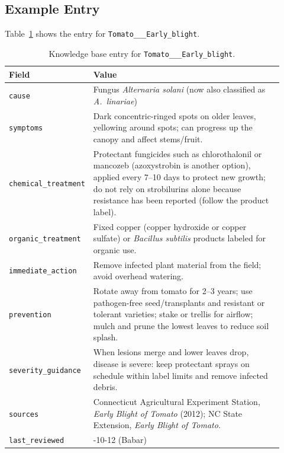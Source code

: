 \subsection{Example Entry}
Table~\ref{tab:kb_example} shows the entry for \texttt{Tomato\_\_\_Early\_blight}.

\begin{table}[htbp]
\centering
\small
\caption{Knowledge base entry for \texttt{Tomato\_\_\_Early\_blight}.}
\label{tab:kb_example}
\begin{tabular}{>{\raggedright\arraybackslash}p{0.22\linewidth}>{\raggedright\arraybackslash}p{0.70\linewidth}}
\toprule
\textbf{Field} & \textbf{Value} \\
\midrule
\texttt{cause} & Fungus \textit{Alternaria solani} (now also classified as \textit{A.\ linariae}) \\
\texttt{symptoms} & Dark concentric-ringed spots on older leaves, yellowing around spots; can progress up the canopy and affect stems/fruit. \\
\texttt{chemical\_treatment} & Protectant fungicides such as chlorothalonil or mancozeb (azoxystrobin is another option), applied every 7--10 days to protect new growth; do not rely on strobilurins alone because resistance has been reported (follow the product label). \\
\texttt{organic\_treatment} & Fixed copper (copper hydroxide or copper sulfate) or \textit{Bacillus subtilis} products labeled for organic use. \\
\texttt{immediate\_action} & Remove infected plant material from the field; avoid overhead watering. \\
\texttt{prevention} & Rotate away from tomato for 2--3 years; use pathogen-free seed/transplants and resistant or tolerant varieties; stake or trellis for airflow; mulch and prune the lowest leaves to reduce soil splash. \\
\texttt{severity\_guidance} & When lesions merge and lower leaves drop, disease is severe: keep protectant sprays on schedule within label limits and remove infected debris. \\
\texttt{sources} & Connecticut Agricultural Experiment Station, \textit{Early Blight of Tomato} (2012); NC State Extension, \textit{Early Blight of Tomato}. \\
\texttt{last\_reviewed} & 2026-10-12 (Babar) \\
\bottomrule
\end{tabular}
\end{table}

